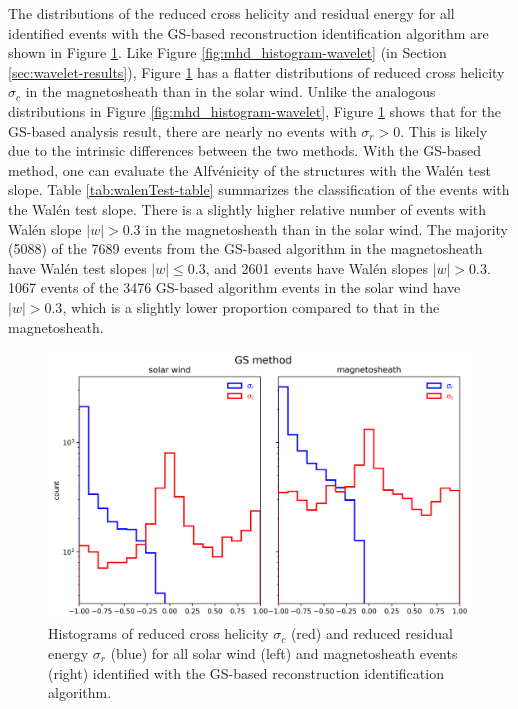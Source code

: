 The distributions of the reduced cross helicity and residual energy for all identified events with the GS-based reconstruction identification algorithm are shown in Figure \ref{fig:mhd_histogram-GS}. Like Figure \ref{fig:mhd_histogram-wavelet} (in Section \ref{sec:wavelet-results}), Figure \ref{fig:mhd_histogram-GS} has a flatter distributions of reduced cross helicity $\sigma_c$ in the magnetosheath than in the solar wind. Unlike the analogous distributions in Figure \ref{fig:mhd_histogram-wavelet}, Figure \ref{fig:mhd_histogram-GS} shows that for the GS-based analysis result, there are nearly no events with $\sigma_r>0$. This is likely due to the intrinsic differences between the two methods. With the GS-based method, one can evaluate the Alfv\'enicity of the structures with the Wal\'en test slope. Table \ref{tab:walenTest-table} summarizes the classification of the events with the Wal\'en test slope. There is a slightly higher relative number of events with Wal\'en slope $|w|>0.3$ in the magnetosheath than in the solar wind. The majority (5088) of the 7689 events from the GS-based algorithm in the magnetosheath have Wal\'en test slopes $|w|\leq 0.3$, and 2601 events have Wal\'en slopes $|w|>0.3$. 1067 events of the 3476 GS-based algorithm events in the solar wind have $|w|>0.3$, which is a slightly lower proportion compared to that in the magnetosheath.

\begin{figure}
    \centering
    \includegraphics[width=\textwidth]{Figures/Histograms/sigr_sigc_GS.png}
    \caption[Reduced cross helicity and reduced residual energy for all events identified via GS-based reconstruction algorithm]{Histograms of reduced cross helicity $\sigma_c$ (red) and reduced residual energy $\sigma_r$ (blue) for all solar wind (left) and magnetosheath events (right) identified with the GS-based reconstruction identification algorithm.}
    \label{fig:mhd_histogram-GS}
\end{figure}

